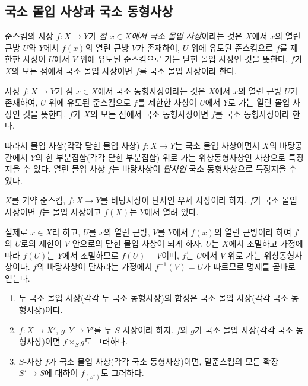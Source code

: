 \subsection{국소 몰입 사상과 국소 동형사상}
\label{subsection:I.4.5-ko}

\begin{definition}[4.5.1]
\label{I.4.5.1-ko}
준스킴의 사상 $f:X\to Y$가 \emph{점 $x\in X$에서 국소 몰입
사상}이라는 것은 $X$에서 $x$의 열린 근방 $U$와 $Y$에서 $f(x)$의
열린 근방 $V$가 존재하여, $U$ 위에 유도된 준스킴으로 $f$를 제한한
사상이 $U$에서 $V$ 위에 유도된 준스킴으로 가는 닫힌 몰입 사상인
것을 뜻한다. $f$가 $X$의 모든 점에서 국소 몰입 사상이면 $f$를 국소
몰입 사상이라 한다.
\end{definition}

\begin{definition}[4.5.2]
\label{I.4.5.2-ko}
사상 $f:X\to Y$가
점 $x\in X$에서 국소 동형사상이라는 것은 $X$에서 $x$의 열린 근방
$U$가 존재하여, $U$ 위에 유도된 준스킴으로 $f$를 제한한 사상이
$U$에서 $Y$로 가는 열린 몰입 사상인 것을 뜻한다. $f$가 $X$의 모든
점에서 국소 동형사상이면 $f$를 국소 동형사상이라 한다.
\end{definition}

\begin{env}[4.5.3]
\label{I.4.5.3-ko}
따라서 몰입 사상(각각 닫힌 몰입 사상) $f:X\to Y$는 국소 몰입
사상이면서 $X$의 바탕공간에서 $Y$의 한 부분집합(각각 닫힌
부분집합) 위로 가는 위상동형사상인 사상으로 특징지을 수 있다. 열린
몰입 사상 $f$는 바탕사상이 \emph{단사인} 국소 동형사상으로 특징지을
수 있다.
\end{env}

\begin{proposition}[4.5.4]
\label{I.4.5.4-ko}
$X$를 기약 준스킴, $f:X\to Y$를 바탕사상이 단사인 우세 사상이라
하자. $f$가 국소 몰입 사상이면 $f$는 몰입 사상이고 $f(X)$는 $Y$에서
열려 있다.
\end{proposition}

실제로 $x\in X$라 하고, $U$를 $x$의 열린 근방, $V$를 $Y$에서
$f(x)$의 열린 근방이라 하여 $f$의 $U$로의 제한이 $V$ 안으로의 닫힌
몰입 사상이 되게 하자. $U$는 $X$에서 조밀하고 가정에 따라 $f(U)$는
$Y$에서 조밀하므로 $f(U)=V$이며, $f$는 $U$에서 $V$ 위로 가는
위상동형사상이다. $f$의 바탕사상이 단사라는 가정에서
$f^{-1}(V)=U$가 따르므로 명제를 곧바로 얻는다.

\begin{proposition}[4.5.5]
\label{I.4.5.5-ko}
\begin{enumerate}
  \item[\rm(i)] 두 국소 몰입 사상(각각 두 국소 동형사상)의 합성은
    국소 몰입 사상(각각 국소 동형사상)이다.
  \item[\rm(ii)] $f:X\to X'$, $g:Y\to Y'$를 두 $S$-사상이라 하자.
    $f$와 $g$가 국소 몰입 사상(각각 국소 동형사상)이면
    $f\times_S g$도 그러하다.
  \item[\rm(iii)] $S$-사상 $f$가 국소 몰입 사상(각각 국소
    동형사상)이면, 밑준스킴의 모든 확장 $S'\to S$에 대하여
    $f_{(S')}$도 그러하다.
\end{enumerate}
\end{proposition}

